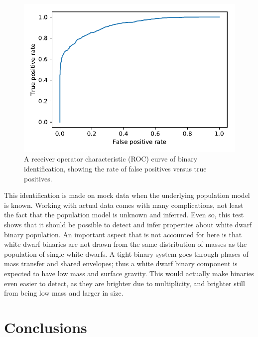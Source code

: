 \documentclass[fleqn,usenatbib]{mnras}
\begin{document}
\begin{figure}
	\includegraphics[width=\columnwidth]{ROC_binaries.pdf}
    \caption{A receiver operator characteristic (ROC) curve of binary identification, showing the rate of false positives versus true positives.}
    \label{fig:ROC_binaries}
\end{figure}

This identification is made on mock data when the underlying population model is known. Working with actual data comes with many complications, not least the fact that the population model is unknown and inferred. Even so, this test shows that it should be possible to detect and infer properties about white dwarf binary population. An important aspect that is not accounted for here is that white dwarf binaries are not drawn from the same distribution of masses as the population of single white dwarfs. A tight binary system goes through phases of mass transfer and shared envelopes; thus a white dwarf binary component is expected to have low mass and surface gravity. This would actually make binaries even easier to detect, as they are brighter due to multiplicity, and brighter still from being low mass and larger in size.







\section{Conclusions}
\end{document}
